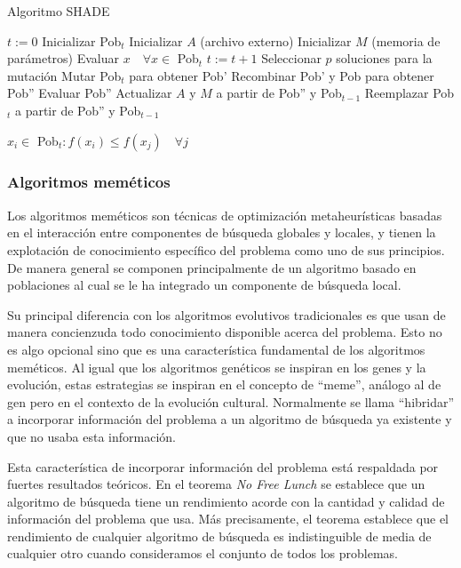 \begin{algorithm}
\caption{Algoritmo SHADE}
\label{alg:shade}
	\begin{algorithmic}
		\State $t:=0$
		\State Inicializar Pob$_t$
		\State Inicializar $A$ (archivo externo)
		\State Inicializar $M$ (memoria de parámetros)
		\State Evaluar $x \quad \forall x \in$ Pob$_t$
			\State $t:=t+1$
			\State Seleccionar $p$ soluciones para la mutación
			\State Mutar Pob$_t$ para obtener Pob'
			\State Recombinar Pob' y Pob para obtener Pob''
			\State Evaluar Pob''
			\State Actualizar $A$ y $M$ a partir de Pob'' y Pob$_{t-1}$
			\State Reemplazar Pob$_t$ a partir de Pob'' y Pob$_{t-1}$
		\EndWhile
		
		
		\Return $x_i \in$ Pob$_t : f(x_i) \leq f(x_j) \quad \forall j$
	\end{algorithmic}
\end{algorithm}






\subsubsection{Algoritmos meméticos}

Los algoritmos meméticos son técnicas de optimización metaheurísticas basadas en el interacción entre componentes de búsqueda globales y locales, y tienen la explotación de conocimiento específico del problema como uno de sus principios. De manera general se componen principalmente de un algoritmo basado en poblaciones al cual se le ha integrado un componente de búsqueda local.

Su principal diferencia con los algoritmos evolutivos tradicionales es que usan de manera concienzuda todo conocimiento disponible acerca del problema. Esto no es algo opcional sino que es una característica fundamental de los algoritmos meméticos. Al igual que los algoritmos genéticos se inspiran en los genes y la evolución, estas estrategias se inspiran en el concepto de ``meme'', análogo al de gen pero en el contexto de la evolución cultural. Normalmente se llama ``hibridar'' a incorporar información del problema a un algoritmo de búsqueda ya existente y que no usaba esta información.

Esta característica de incorporar información del problema está respaldada por fuertes resultados teóricos. En el teorema \textit{No Free Lunch} \cite{nofreelunch} se establece que un algoritmo de búsqueda tiene un rendimiento acorde con la cantidad y calidad de información del problema que usa. Más precisamente, el teorema establece que el rendimiento de cualquier algoritmo de búsqueda es indistinguible de media de cualquier otro cuando consideramos el conjunto de todos los problemas. 

